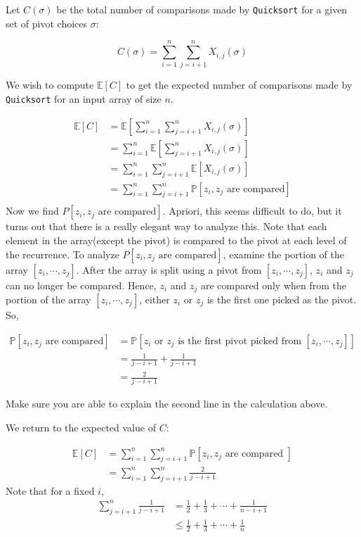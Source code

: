 \documentclass [12pt]{article}
\begin{document}
Let $C(\sigma)$ be the total number of comparisons made by \texttt{Quicksort} for a given set of pivot choices $\sigma$:

$$
C(\sigma) = \sum_{i=1}^n \sum_{j=i+1}^n X_{i,j}(\sigma) 
$$

We wish to compute $\mathbb{E}[C]$ to get the expected number of comparisons made by \texttt{Quicksort}
for an input array of size $n$.

\begin{align*}
  \mathbb{E}[C] &= \mathbb{E}\left[\sum_{i=1}^n \sum_{j=i+1}^n X_{i,j}(\sigma) \right] \tag{definition of $C$} \\
  &= \sum_{i=1}^n \mathbb{E}\left[\sum_{j=i+1}^n X_{i,j}(\sigma) \right] \tag{linearity of expectation on first sum} \\
  &= \sum_{i=1}^n \sum_{j=i+1}^n  \mathbb{E}[X_{i,j}(\sigma)] \tag{linearity of expectation on second sum} \\
  &= \sum_{i=1}^n \sum_{j=i+1}^n  \mathbb{P}[z_i, z_j \text{ are compared} ]  \tag{definition of expectation on indicator variable}\\
\end{align*}
Now we find $P[z_i, z_j \text{ are compared}]$. Apriori, this seems difficult to do, but it turns out that there is a really elegant way to analyze this. Note that each element in the array(except the pivot) is compared to the pivot at each level of the recurrence. To analyze $P[z_i, z_j \text{ are compared}]$, examine the portion of the array $[z_i, \cdots, z_j]$. After the array is split using a pivot from $[z_i, \cdots, z_j]$, $z_i$ and $z_j$ can no longer be compared. Hence, $z_i$ and $z_j$ are compared only when from the portion of the array $[z_i, \cdots, z_j]$, either $z_i$ or $z_j$ is the first one picked as the pivot. So,

\begin{align*}
\mathbb{P}[z_i, z_j \text{ are compared}] &= \mathbb{P}[z_i \text{ or } z_j \text{ is the first pivot picked from } [z_i, \cdots, z_j]] \tag{argued above} \\
&= \frac{1}{j-i+1} + \frac{1}{j - i + 1} \tag{picking from a set uniformly} \\
&= \frac{2}{j-i+1}
\end{align*}

Make sure you are able to explain the second line in the calculation above.

We return to the expected value of $C$:

\begin{align*}
\mathbb{E}[C] &= \sum_{i=1}^n \sum_{j = i + 1}^n \mathbb{P}[z_i, z_j \text{ are compared }] \\
&= \sum_{i=1}^n \sum_{j = i + 1}^n \frac{2}{j-i + 1}
\end{align*}
Note that for a fixed $i$,
\begin{align*}
  \sum_{j=i+1}^n \frac{1}{j-i+1} &= \frac{1}{2} + \frac{1}{3} + \cdots + \frac{1}{n - i + 1} \\
  &\leq \frac{1}{2} + \frac{1}{3} + \cdots + \frac{1}{n}
\end{align*}
\end{document}
